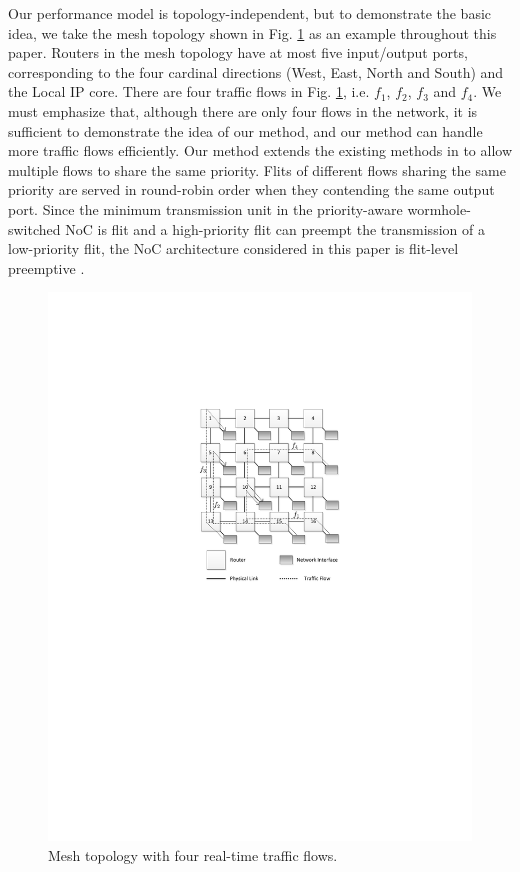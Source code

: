 \documentclass[preprint]{elsarticle}
\begin{document}
Our performance model is topology-independent, but to demonstrate the basic idea, we take the mesh topology shown in Fig. \ref{topology} as an example throughout this paper. Routers in the mesh topology have at most five input/output ports, corresponding to the four cardinal directions (West, East, North and South) and the Local IP core. There are four traffic flows in Fig. \ref{topology}, i.e. $f_1$, $f_2$, $f_3$ and $f_4$. We must emphasize that, although there are only four flows in the network, it is sufficient to demonstrate the idea of our method, and our method can handle more traffic flows efficiently. Our method extends the existing methods in \cite{73}\cite{Qian489900} to allow multiple flows to share the same priority. Flits of different flows sharing the same priority are served in round-robin order when they contending the same output port. Since the minimum transmission unit in the priority-aware wormhole-switched NoC is flit and a high-priority flit can preempt the transmission of a low-priority flit, the NoC architecture considered in this paper is flit-level preemptive \cite{Lee:2003:RWC:846077.846083}.
\begin{figure}
  \centering
  \includegraphics[scale=0.85]{figures/mesh.pdf}
  \caption{Mesh topology with four real-time traffic flows.}\label{topology}
\end{figure}
\end{document}
